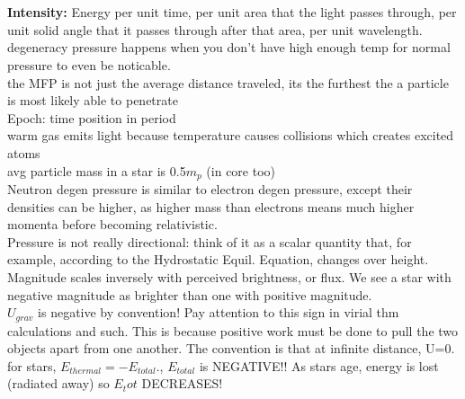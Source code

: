 \documentclass[10pt]{article}
\begin{document}
\\
	\\ \textbf{Intensity:} Energy per unit time, per unit area that the light passes through, per unit solid angle that it passes through after that area, per unit wavelength.
	\\ degeneracy pressure happens when you don't have high enough temp for normal pressure to even be noticable.
	\\ the MFP is not just the average distance traveled, its the furthest the a particle is most likely able to penetrate
	\\ Epoch: time position in period
	\\ warm gas emits light because temperature causes collisions which creates excited atoms
	\\ avg particle mass in a star is 0.5$m_p$ (in core too)
	\\ Neutron degen pressure is similar to electron degen pressure, except their densities can be higher, as higher mass than electrons means much higher momenta before becoming relativistic.
	\\ Pressure is not really directional: think of it as a scalar quantity that, for example, according to the Hydrostatic Equil. Equation, changes over height.
	\\ Magnitude scales inversely with perceived brightness, or flux. We see a star with negative magnitude as brighter than one with positive magnitude.
	\\ $U_{grav}$ is negative by convention! Pay attention to this sign in virial thm calculations and such. This is because positive work must be done to pull the two objects apart from one another. The convention is that at infinite distance, U=0.
	\\ for stars, $E_{thermal} = -E_{total}$., $E_{total}$ is NEGATIVE!! As stars age, energy is lost (radiated away) so $E_tot$ DECREASES!
\end{document}
